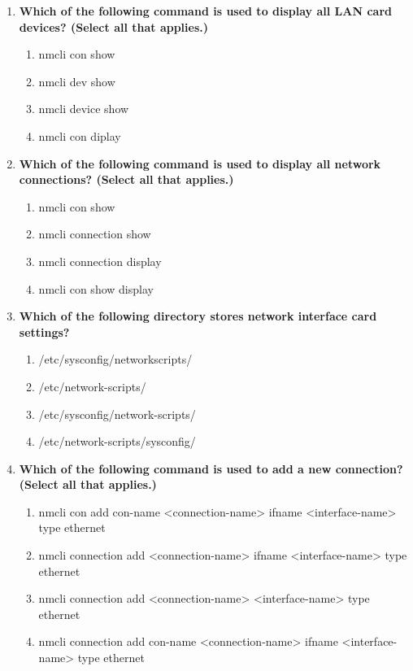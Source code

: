 \begin{flushleft}
\begin{enumerate}
		\newpage
		\item \textbf{Which of the following command is used to display all LAN card devices? (Select all that applies.)}
		\begin{enumerate}[label=(\alph*)]
			\item nmcli con show
			\item nmcli dev show %
			\item nmcli device show %
			\item nmcli con diplay
		\end{enumerate}
		\bigskip
		\bigskip		
		
		\item \textbf{Which of the following command is used to display all network connections? (Select all that applies.)}
		\begin{enumerate}[label=(\alph*)]
			\item nmcli con show  %
			\item nmcli connection show %
			\item nmcli connection display %
			\item nmcli con show display
		\end{enumerate}
		\bigskip
		\bigskip		

		\item \textbf{Which of the following directory stores network interface card settings?}
		\begin{enumerate}[label=(\alph*)]
			\item /etc/sysconfig/networkscripts/
			\item /etc/network-scripts/
			\item /etc/sysconfig/network-scripts/  %
			\item /etc/network-scripts/sysconfig/
		\end{enumerate}
		\bigskip
		\bigskip	

		\item \textbf{Which of the following command is used to add a new connection? (Select all that applies.)}
		\begin{enumerate}[label=(\alph*)]
			\item nmcli con add con-name <connection-name> ifname <interface-name> type ethernet  %
			\item nmcli connection add <connection-name> ifname <interface-name> type ethernet    
			\item nmcli connection add <connection-name> <interface-name> type ethernet  
			\item nmcli connection add con-name <connection-name> ifname <interface-name> type ethernet    %
		\end{enumerate}
		\bigskip
		\bigskip	
		

\end{enumerate}
\end{flushleft}
